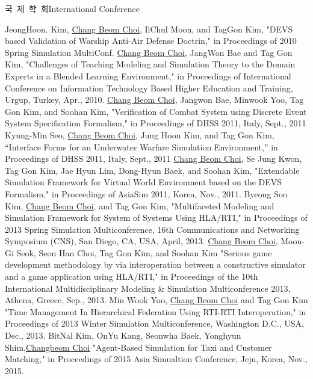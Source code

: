\documentclass[english,full]{resume_structure}
\begin{document}
\begin{Publication}
{국\ 제\ 학\ 회}{International Conference}
{}{} 
{
\begin{itemize}
   {JeongHoon. Kim, \underline{Chang Beom Choi}, IlChul Moon, and TagGon Kim, "DEVS based Validation of Warship Anti-Air Defense Doctrin," in Proceedings of 2010 Spring Simulation MultiConf.}
   {\underline{Chang Beom Choi}, JangWon Bae and Tag Gon Kim, "Challenges of Teaching Modeling and Simulation Theory to the Domain Experts in a Blended Learning Environment," in Proceedings of International Conference on Information Technology Based Higher Education and Training, Urgup, Turkey, Apr., 2010.}
   {\underline{Chang Beom Choi}, Jangwon Bae, Minwook Yoo, Tag Gon Kim, and Soohan Kim, "Verification of Combat System using Discrete Event System Specification Formalism," in Proceedings of DHSS 2011, Italy, Sept., 2011}
   {Kyung-Min Seo, \underline{Chang Beom Choi}, Jung Hoon Kim, and Tag Gon Kim, “Interface Forms for an Underwater Warfare Simulation Environment,” in Proceedings of DHSS 2011, Italy, Sept., 2011}
   {\underline{Chang Beom Choi}, Se Jung Kwon, Tag Gon Kim, Jae Hyun Lim, Dong-Hyun Baek, and Soohan Kim, "Extendable Simulation Framework for Virtual World Environment based on the DEVS Formalism," in Proceedings of AsiaSim 2011, Korea, Nov., 2011.}
   {Byeong Soo Kim, \underline{Chang Beom Choi}, and Tag Gon Kim, "Multifaceted Modeling and Simulation Framework for System of Systems Using HLA/RTI," in Proceedings of 2013 Spring Simulation Multiconference, 16th Communications and Networking Symposium (CNS), San Diego, CA, USA, April, 2013.}
   {\underline{Chang Beom Choi}, Moon-Gi Seok, Seon Han Choi, Tag Gon Kim, and Soohan Kim "Serious game development methodology by via interoperation between a constructive simulator and a game application using HLA/RTI," in Proceedings of the 10th International Multidisciplinary Modeling \& Simulation Multiconference 2013, Athena, Greece, Sep., 2013.}
   {Min Wook Yoo, \underline{Chang Beom Choi} and Tag Gon Kim "Time Management In Hierarchical Federation Using RTI-RTI Interoperation," in Proceedings of 2013 Winter Simulation Multiconference, Washington D.C., USA, Dec., 2013.}
   {BitNal Kim, OnYu Kang, Seonwha Baek, Yonghyun Shim,\underline{Changbeom Choi} "Agent-Based Simulation for Taxi and Customer Matching," in Proceedings of 2015 Asia Simualtion Conference, Jeju, Korea, Nov., 2015.}

\end{itemize}}
\end{Publication}
\end{document}
